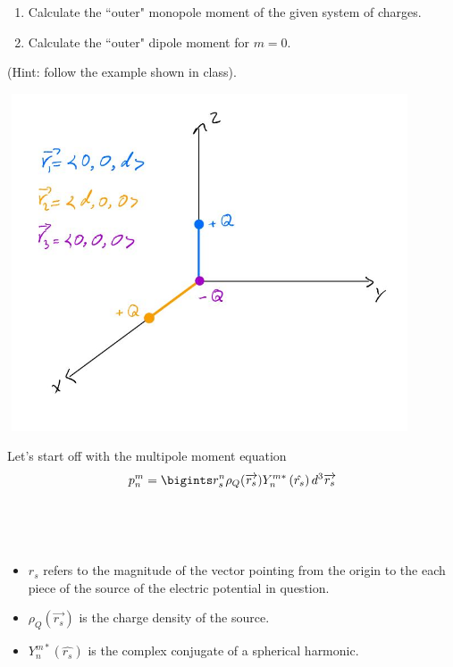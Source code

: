 \documentclass[fleqn]{article}
\begin{document}
\begin{enumerate}
    \begin{enumerate}
      \item Calculate the ``outer" monopole moment of the given system of charges. 
      
      \item Calculate the ``outer" dipole moment for $m=0$. 
    
    \end{enumerate}
    (Hint: follow the example shown in class). 

    \includegraphics[height=10cm, width=12cm]{One.JPG}

      \textcolor{hwColor}{
        Let's start off with the multipole moment equation 
        $$p^m_n=\bigints r^n_s \rho_Q(\overrightarrow{r_s}) Y^{m*}_n \left(\hat{r_s}\right) d^3 \overrightarrow{r_s}$$ \\
        \\
        \\
        \begin{itemize}
          \item $r_s$ refers to the magnitude of the vector pointing from the origin to the each piece of the source of the
          electric potential in question. 
          \item $\rho_Q(\overrightarrow{r_s})$ is the charge density of the source.
          \item $Y^{m*}_n \left(\hat{r_s}\right)$ is the complex conjugate of a spherical harmonic. 
        \end{itemize}
      }


\end{enumerate}
\end{document}
